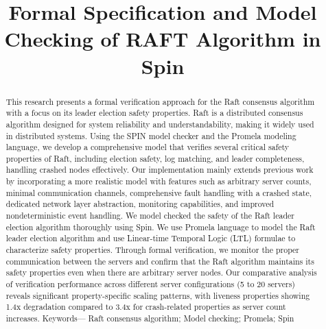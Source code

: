 \documentclass[a4paper]{llncs}
\begin{document}
    \title{Formal Specification and Model Checking of RAFT Algorithm in Spin\\}

   \author{}
    \institute{}
    \maketitle

    \begin{abstract}
        This research presents a formal verification approach for the Raft consensus
        algorithm with a focus on its leader election safety properties. Raft is
        a distributed consensus algorithm designed for system reliability and
        understandability, making it widely used in distributed systems. Using
        the SPIN model checker and the Promela modeling language, we develop a comprehensive
        model that verifies several critical safety properties of Raft, including
        election safety, log matching, and leader completeness, handling crashed
        nodes effectively. Our implementation mainly extends previous work by incorporating
        a more realistic model with features such as arbitrary server counts, minimal
        communication channels, comprehensive fault handling with a crashed
        state, dedicated network layer abstraction, monitoring capabilities, and
        improved nondeterministic event handling. We model checked the safety of
        the Raft leader election algorithm thoroughly using Spin. We use Promela
        language to model the Raft leader election algorithm and use Linear-time
        Temporal Logic (LTL) formulae to characterize safety properties. Through
        formal verification, we monitor the proper communication between the servers
        and confirm that the Raft algorithm maintains its safety properties even
        when there are arbitrary server nodes. Our comparative analysis of verification performance across different server configurations (5 to 20 servers) reveals significant property-specific scaling patterns, with liveness properties showing 1.4x degradation compared to 3.4x for crash-related properties as server count increases.
        \newline
        Keywords— Raft consensus algorithm; Model checking; Promela; Spin
    \end{abstract}
\end{document}
